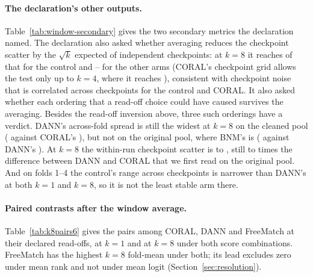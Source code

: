

\paragraph{The declaration's other outputs.} Table~\ref{tab:window-secondary} gives the two
secondary metrics the declaration named. The declaration also asked whether averaging reduces
the checkpoint scatter by the $\sqrt{k}$ expected of independent checkpoints: at $k=8$ it
reaches \winSqrtkLam{} of that for the control and \winSqrtkMin{}--\winSqrtkMax{} for the other
arms (CORAL's checkpoint grid allows the test only up to $k=4$, where it reaches
\winSqrtkCoral{}), consistent with checkpoint noise that is correlated across checkpoints for
the control and CORAL. It also asked whether each ordering that a read-off choice could have
caused survives the averaging. Besides the read-off inversion above, three such orderings have
a verdict. DANN's across-fold spread is still the widest at $k=8$ on the cleaned pool
(\winSixDann{} against CORAL's \winSixCoral{}), but not on the original pool, where BNM's is
(\winSixBnmOrig{} against DANN's \winSixDannOrig{}). At $k=8$ the within-run checkpoint scatter
is \winEightSdLo{} to \winEightSdHi{}, still \winEightMultLo{} to \winEightMultHi{} times the
\winEightDiff{} difference between DANN and CORAL that we first read on the original pool. And
on folds 1--4 the control's range across checkpoints is narrower than DANN's at both $k=1$ and
$k=8$, so it is not the least stable arm there.



\paragraph{Paired contrasts after the window average.} Table~\ref{tab:k8pairs6} gives the
\rwFiveKPairsWord{} pairs among CORAL, DANN and FreeMatch at their declared read-offs, at $k=1$
and at $k=8$ under both score combinations. FreeMatch has the highest $k=8$ fold-mean under
both; its lead excludes zero under mean rank and not under mean logit
(Section~\ref{sec:resolution}).



